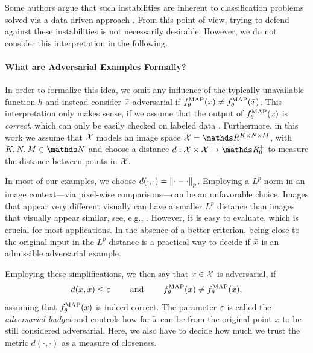 \begin{remark}{}{}
Some authors argue that such instabilities are inherent to classification problems solved via a data-driven approach \cite{shafahi2018adversarial, fawzi2018adversarial}. From this point of view, trying to defend against these instabilities is not necessarily desirable. However, we do not consider this interpretation in the following.
\end{remark}
%
%
%
\paragraph{What are Adversarial Examples Formally?} In order to formalize this idea, we omit any influence of the typically unavailable function $h$ and instead consider $\bar{x}$ adversarial if $f_\theta^{\operatorname{MAP}}(x)\neq f^{\operatorname{MAP}}_\theta(\bar{x})$. This interpretation only makes sense, if we assume that the output of  $f^{\operatorname{MAP}}_\theta(x)$ is \emph{correct}, which can only be easily checked on labeled data \cite{bungert2023begins}. Furthermore, in this work we assume that $\mathcal{X}$ models an image space $\Inp=\R^{K\times N\times M}$, with $K,N,M\in\N$ and choose a distance $d:\Inp\times\Inp\to\R^+_0$ to measure the distance between points in $\mathcal{X}$. 
%
\begin{remark}{}{}
In most of our examples, we choose $d(\cdot,\cdot) = \left\|\cdot - \cdot\right\|_p$. Employing a $L^p$ norm in an image context---via pixel-wise comparisons---can be an unfavorable choice. Images that appear very different visually can have a smaller $L^p$ distance than images that visually appear similar, see, e.g., \cite[Fig. 16]{stanczuk2021wasserstein}. However, it is easy to evaluate, which is crucial for most applications. In the absence of a better criterion, being close to the original input in the $L^p$ distance is a practical way to decide if $\bar{x}$ is an admissible adversarial example. 
\end{remark}
%
%
\noindent%
Employing these simplifications, we then say that $\bar{x}\in\mathcal{X}$ is adversarial, if
%
\begin{align*}
d(x,\bar{x}) \leq \varepsilon \qquad \text{ and } \qquad f_\theta^{\operatorname{MAP}}(x)\neq f_\theta^{\operatorname{MAP}}(\bar{x}),
\end{align*}
%
assuming that $f_\theta^{\operatorname{MAP}}(x)$ is indeed correct. The parameter $\varepsilon$ is called the \emph{adversarial budget} and controls how far $\tilde{x}$ can be from the original point $x$ to be still considered adversarial. Here, we also have to decide how much we trust the metric $d(\cdot,\cdot)$ as a measure of closeness.
%
%
